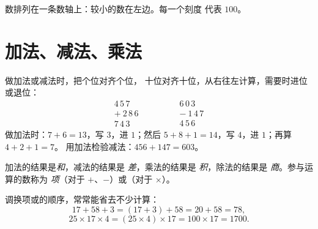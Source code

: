 \begin{omfigure}

{\small 数排列在一条数轴上：较小的数在左边。每一个刻度
代表 $100$。}
\end{omfigure}

\section{加法、减法、乘法}

\begin{example}[竖式计算]\label{ex:g6:wholes:columns}
做加法或减法时，把个位对齐个位，
十位对齐十位，从右往左计算，需要时进位或退位：
\[
\begin{array}{r}
4\,5\,7 \\
+\ 2\,8\,6 \\
\hline
7\,4\,3
\end{array}
\qquad\qquad
\begin{array}{r}
6\,0\,3 \\
-\ 1\,4\,7 \\
\hline
4\,5\,6
\end{array}
\]
做加法时：$7 + 6 = 13$，写 $3$，进 $1$；然后
$5 + 8 + 1 = 14$，写 $4$，进 $1$；再算 $4 + 2 + 1 = 7$。
用加法检验减法：$456 + 147 = 603$。
\end{example}

\begin{remark}[词汇]
加法的结果是\emph{和}，减法的结果是
\emph{差}，乘法的结果是
\emph{积}，除法的结果是
\emph{商}。参与运算的数称为
\emph{项}（对于 $+$、$-$）或\emph{}（对于 $\times$）。
\end{remark}

\begin{example}[巧算]\label{ex:g6:wholes:smart}
调换项或的顺序，常常能省去不少计算：
\[
17 + 58 + 3 = (17 + 3) + 58 = 20 + 58 = 78 ,
\]
\[
25 \times 17 \times 4 = (25 \times 4) \times 17 = 100 \times 17 = 1700 .
\]
\end{example}

